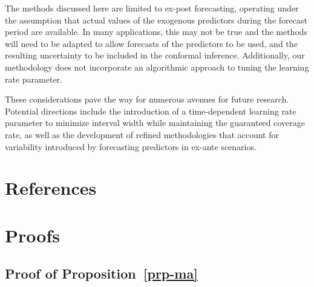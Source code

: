 \documentclass[
  11pt,
  a4paper,
]{article}
\theoremstyle{plain}
\theoremstyle{remark}
\begin{document}
The methods discussed here are limited to ex-post forecasting, operating
under the assumption that actual values of the exogenous predictors
during the forecast period are available. In many applications, this may
not be true and the methods will need to be adapted to allow forecasts
of the predictors to be used, and the resulting uncertainty to be
included in the conformal inference. Additionally, our methodology does
not incorporate an algorithmic approach to tuning the learning rate
parameter.

These considerations pave the way for numerous avenues for future
research. Potential directions include the introduction of a
time-dependent learning rate parameter to minimize interval width while
maintaining the guaranteed coverage rate, as well as the development of
refined methodologies that account for variability introduced by
forecasting predictors in ex-ante scenarios.

\section*{References}\label{references}

\printbibliography[heading=none]

\newpage
\appendix
\setcounter{section}{0}
\renewcommand{\thesection}{Appendix \Alph{section}}
\renewcommand{\thesubsection}{\Alph{section}.\arabic{subsection}}
\renewcommand{\thefigure}{A\arabic{figure}}
\renewcommand{\thetable}{A\arabic{table}}
\setcounter{figure}{0}
\setcounter{table}{0}

\section{Proofs}\label{sec-proof}

\subsection{\texorpdfstring{Proof of
Proposition~\ref{prp-ma}}{Proof of Proposition~}}\label{sec-proof_ma}

\end{document}
